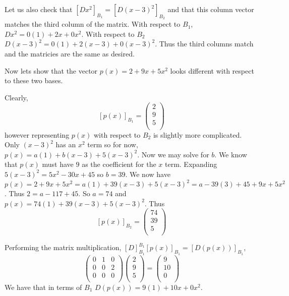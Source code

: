 \documentclass{article}
\theoremstyle{problemstyle}
\begin{document}
Let us also check that $[Dx^2]_{B_1} = [D(x-3)^2]_{B_2}$ and that this column vector matches the third column of the matrix. With respect to $B_1$, $Dx^2 = 0(1)+2x+0x^2$. With respect to $B_2$ $D(x-3)^2 = 0(1)+2(x-3)+0(x-3)^2$. Thus the third columns match and the matricies are the same as desired. 

Now lets show that the vector $p(x) = 2 + 9x + 5x^2$ looks different with respect to these two bases. 

Clearly, $$[p(x)]_{B_1} = \begin{pmatrix} 2  \\
 9   \\
  5   \\
\end{pmatrix}$$ however representing $p(x)$ with respect to $B_2$ is slightly more complicated.\\

Only $(x-3)^2$ has an $x^2$ term so for now, $p(x) = a(1)+b(x-3)+5(x-3)^2$. Now we may solve for $b$. We know that $p(x)$ must have $9$ as the coefficient for the $x$ term. Expanding $5(x-3)^2 = 5x^2 - 30x +45$ so $b = 39$. We now have $p(x) = 2 + 9x + 5x^2 = a(1)+39(x-3)+5(x-3)^2 = a - 39(3) + 45 + 9x + 5x^2$. Thus $2 = a - 117 + 45$. So $a = 74$ and $p(x) = 74(1)+39(x-3)+5(x-3)^2$. Thus $$[p(x)]_{B_2} = \begin{pmatrix} 74  \\
 39   \\
  5   \\
\end{pmatrix}$$

Performing the matrix multiplication, $[D]_{B_1}^{B_1}[p(x)]_{B_1} = [D(p(x))]_{B_1}$,  $$
\begin{pmatrix} 0 & 1& 0  \\
 0 & 0& 2   \\
  0 & 0& 0   \\
\end{pmatrix}\begin{pmatrix} 2  \\
 9   \\
  5   \\
\end{pmatrix} = \begin{pmatrix} 9  \\
 10   \\
  0   \\
\end{pmatrix} 
$$
We have that in terms of $B_1$ $D(p(x)) = 9(1)+10x+0x^2$.\\
\end{document}
